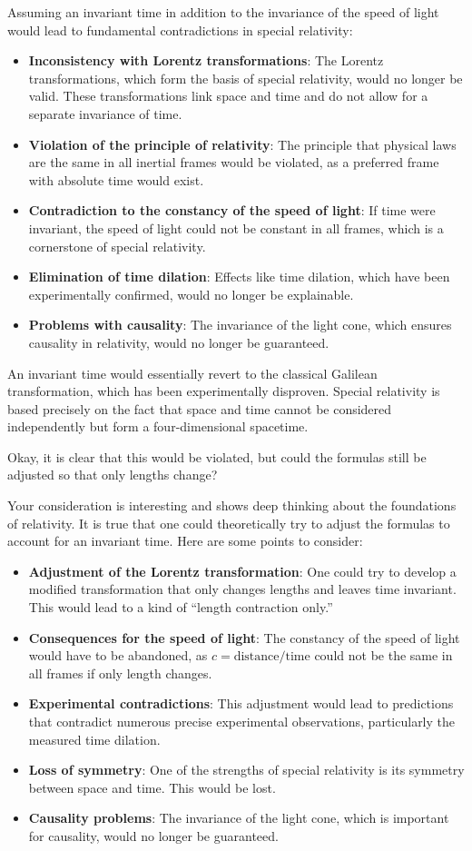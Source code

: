 \documentclass[a4paper,12pt]{article}
\begin{document}
	Assuming an invariant time in addition to the invariance of the speed of light would lead to fundamental contradictions in special relativity:
	\begin{itemize}
		\item \textbf{Inconsistency with Lorentz transformations}: The Lorentz transformations, which form the basis of special relativity, would no longer be valid. These transformations link space and time and do not allow for a separate invariance of time.
		\item \textbf{Violation of the principle of relativity}: The principle that physical laws are the same in all inertial frames would be violated, as a preferred frame with absolute time would exist.
		\item \textbf{Contradiction to the constancy of the speed of light}: If time were invariant, the speed of light could not be constant in all frames, which is a cornerstone of special relativity.
		\item \textbf{Elimination of time dilation}: Effects like time dilation, which have been experimentally confirmed, would no longer be explainable.
		\item \textbf{Problems with causality}: The invariance of the light cone, which ensures causality in relativity, would no longer be guaranteed.
	\end{itemize}
	An invariant time would essentially revert to the classical Galilean transformation, which has been experimentally disproven. Special relativity is based precisely on the fact that space and time cannot be considered independently but form a four-dimensional spacetime.
	
	Okay, it is clear that this would be violated, but could the formulas still be adjusted so that only lengths change?
	
	Your consideration is interesting and shows deep thinking about the foundations of relativity. It is true that one could theoretically try to adjust the formulas to account for an invariant time. Here are some points to consider:
	\begin{itemize}
		\item \textbf{Adjustment of the Lorentz transformation}: One could try to develop a modified transformation that only changes lengths and leaves time invariant. This would lead to a kind of ``length contraction only.''
		\item \textbf{Consequences for the speed of light}: The constancy of the speed of light would have to be abandoned, as \( c = \text{distance/time} \) could not be the same in all frames if only length changes.
		\item \textbf{Experimental contradictions}: This adjustment would lead to predictions that contradict numerous precise experimental observations, particularly the measured time dilation.
		\item \textbf{Loss of symmetry}: One of the strengths of special relativity is its symmetry between space and time. This would be lost.
		\item \textbf{Causality problems}: The invariance of the light cone, which is important for causality, would no longer be guaranteed.
	\end{itemize}
	
\end{document}
